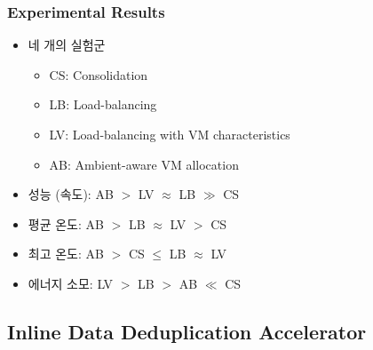 \subsubsection*{Experimental Results}
\begin{itemize}
    \item 네 개의 실험군
    \begin{itemize}
        \item CS: Consolidation
        \item LB: Load-balancing
        \item LV: Load-balancing with VM characteristics
        \item AB: Ambient-aware VM allocation
    \end{itemize}
    \item 성능 (속도): AB $>$ LV $\approx$ LB $\gg$ CS
    \item 평균 온도: AB $>$ LB $\approx$ LV $>$ CS
    \item 최고 온도: AB $>$ CS $\leq$ LB $\approx$ LV
    \item 에너지 소모: LV $>$ LB $>$ AB $\ll$ CS
\end{itemize}

\subsection{Inline Data Deduplication Accelerator}

